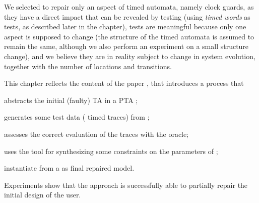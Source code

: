 \begin{tikzborder}{\cite{Gargantini16:validation}}
\begin{tikzborder}{\cite{gargantini_combinatorial_2017}}
\begin{tikzborder}{\cite{gargantini_combinatorial_2017}}
\begin{tikzborder}{\cite{garn2019}}
\begin{tikzborder}{\cite{arcaini2019achieving}}
\begin{tikzborder}{\cite{arcaini2019varivolution}}
We selected to repair only an aspect of timed automata, namely clock guards, as they have a direct impact that can be revealed by testing (using \textit{timed words} as tests, as described later in the chapter), tests are meaningful because only one aspect is supposed to change (the structure of the timed automata is assumed to remain the same, although we also perform an experiment on a small structure change), and we believe they are in reality subject to change in system evolution, together with the number of locations and transitions.

This chapter reflects the content of the paper \cite{andre_tap_2019}, that introduces a process that
%
\begin{inparaenum}[(i)]
	\item abstracts the initial (faulty) TA \initTa in a PTA \ptaProc;
	\item generates some test data (\ie{} timed traces) from \ptaProc;
	\item assesses the correct evaluation of the traces with the oracle;
	\item uses the \imitator tool for synthesizing some constraints \ptaConstr on the parameters of \ptaProc;
	\item instantiate from \ptaConstr a \ta \repTa as final repaired model.
\end{inparaenum}
%
Experiments show that the approach is successfully able to partially repair the initial design of the user.



\end{tikzborder}
\end{tikzborder}
\end{tikzborder}
\end{tikzborder}
\end{tikzborder}
\end{tikzborder}
